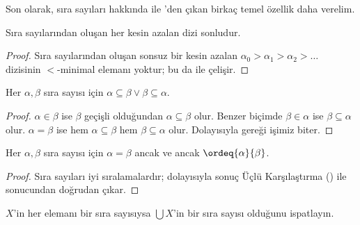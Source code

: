 Son olarak, sıra sayıları hakkında  ile
'den çıkan birkaç temel özellik daha verelim.

\begin{prop}
Sıra sayılarından oluşan her kesin azalan dizi sonludur.
\end{prop}

\begin{proof}
Sıra sayılarından oluşan sonsuz bir kesin azalan
$\alpha_0>\alpha_1>\alpha_2>\ldots$ dizisinin $<$-minimal elemanı yoktur;
bu da  ile çelişir.
\end{proof}

\begin{prop}
Her $\alpha,\beta$ sıra sayısı için
$\alpha\subseteq\beta\lor\beta\subseteq\alpha$.
\end{prop}

\begin{proof}
$\alpha\in\beta$ ise $\beta$ geçişli olduğundan
$\alpha\subseteq\beta$ olur. Benzer biçimde $\beta\in\alpha$ ise
$\beta\subseteq\alpha$ olur. $\alpha=\beta$ ise hem
$\alpha\subseteq\beta$ hem $\beta\subseteq\alpha$ olur. Dolayısıyla
 gereği işimiz biter.
\end{proof}

\begin{prop}
Her $\alpha,\beta$ sıra sayısı için $\alpha=\beta$ ancak ve ancak
$\ordeq{\alpha}{\beta}$.
\end{prop}

\begin{proof}
Sıra sayıları iyi sıralamalardır; dolayısıyla sonuç Üçlü Karşılaştırma
() ile
 sonucundan doğrudan çıkar.
\end{proof}

\begin{prob}
$X$'in her elemanı bir sıra sayısıysa $\bigcup X$'in bir sıra sayısı
olduğunu ispatlayın.
\end{prob}

